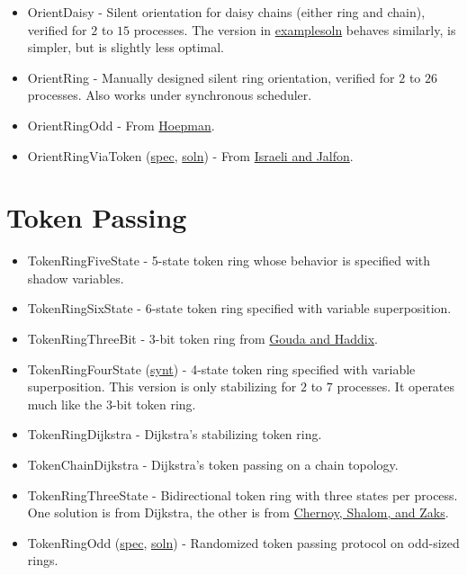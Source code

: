\begin{itemize}
\item OrientDaisy \href{Orientation.html#sec:OrientDaisy}{\LinkText}
- Silent orientation for daisy chains (either ring and chain), verified for $2$ to $15$ processes.
The version in \href{\examplesoln}{examplesoln} behaves similarly, is simpler, but is slightly less optimal.
\item OrientRing \href{Orientation.html#sec:OrientRing}{\LinkText}
- Manually designed silent ring orientation, verified for $2$ to $26$ processes.
Also works under synchronous scheduler.
\item OrientRingOdd \href{Orientation.html#sec:OrientRingOdd}{\LinkText}
- From \href{http://dx.doi.org/10.1007/BFb0020439}{Hoepman}.
\item OrientRingViaToken (\href{\examplespec/OrientRingViaToken.prot}{spec}, \href{\examplesoln/OrientRingViaToken.prot}{soln})
- From \href{http://dx.doi.org/10.1006/inco.1993.1029}{Israeli and Jalfon}.
\end{itemize}

\section{Token Passing}

\begin{itemize}
\item TokenRingFiveState \href{TokenPassing.html#sec:TokenRingFiveState}{\LinkText}
- 5-state token ring whose behavior is specified with shadow variables.
\item TokenRingSixState \href{TokenPassing.html#sec:TokenRingSixState}{\LinkText}
- 6-state token ring specified with variable superposition.
\item TokenRingThreeBit \href{TokenPassing.html#sec:TokenRingThreeBit}{\LinkText}
- 3-bit token ring from \href{http://dx.doi.org/10.1006/jpdc.1996.0066}{Gouda and Haddix}.
\item TokenRingFourState (\href{\examplesynt/TokenRingFourState.prot}{synt})
- 4-state token ring specified with variable superposition.
This version is only stabilizing for $2$ to $7$ processes.
It operates much like the 3-bit token ring.
\item TokenRingDijkstra \href{TokenPassing.html#sec:TokenRingDijkstra}{\LinkText}
- Dijkstra's stabilizing token ring.
\item TokenChainDijkstra \href{TokenPassing.html#sec:TokenChainDijkstra}{\LinkText}
- Dijkstra's token passing on a chain topology.
\item TokenRingThreeState \href{TokenPassing.html#sec:TokenRingThreeState}{\LinkText}
- Bidirectional token ring with three states per process.
One solution is from Dijkstra, the other is from \href{http://citeseerx.ist.psu.edu/viewdoc/summary?doi=10.1.1.153.6017}{Chernoy, Shalom, and Zaks}.
\item TokenRingOdd (\href{\examplespec/TokenRingOdd.prot}{spec}, \href{\examplesoln/TokenRingOdd.prot}{soln})
- Randomized token passing protocol on odd-sized rings.
\end{itemize}

